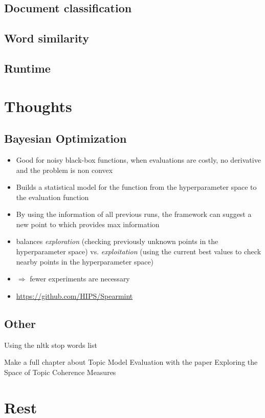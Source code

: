 \documentclass[
        a4paper,
        titlepage,
        twoside,
        parskip
        ]{scrbook}
\theoremstyle{break}
\begin{document}
\section{Document classification}
\section{Word similarity}


\section{Runtime}
\chapter{Thoughts}
\section{Bayesian Optimization}
\begin{itemize}
  \item Good for noisy black-box functions, when evaluations are costly, no derivative and the problem is non convex
  \item Builds a statistical model for the function from the hyperparameter space to the evaluation function
  \item By using the information of all previous runs, the framework can suggest a new point to which provides max information
  \item balances \emph{exploration} (checking previously unknown points in the hyperparameter space) vs. \emph{exploitation} (using the current best values to check nearby points in the hyperparameter space)
  \item $\Rightarrow$ fewer experiments are necessary
  \item \url{https://github.com/HIPS/Spearmint}
\end{itemize}
\section{Other}
Using the nltk stop words list

Make a full chapter about Topic Model Evaluation with the paper Exploring the Space of Topic Coherence Measures
\chapter{Rest}


\clearpage

\printbibliography
\begin{appendices}
%
\end{appendices}

%
\end{document}
